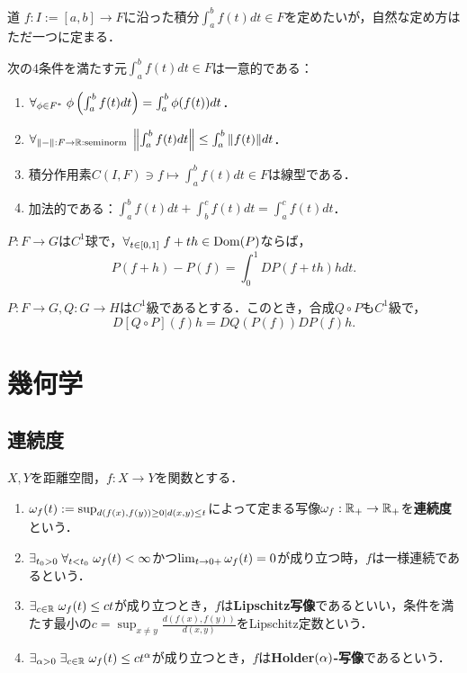 \documentclass[uplatex,dvipdfmx]{jsreport}
\begin{document}
\begin{notation}
    道
    $f:I:=[a,b]\to F$に沿った積分$\int^b_af(t)dt\in F$を定めたいが，自然な定め方はただ一つに定まる．
\end{notation}

\begin{theorem}
    次の4条件を満たす元$\int^b_af(t)dt\in F$は一意的である：
    \begin{enumerate}
        \item $\forall_{\phi\in F^*}\;\phi\left(\int^b_af(t)dt\right)=\int^b_a\phi(f(t))dt$．
        \item $\forall_{\|-\|:F\to\mathbb{R}:\text{seminorm}}\;\left\|\int^b_af(t)dt\right\|\le\int^b_a\|f(t)\|dt$．
        \item 積分作用素$C(I,F)\ni f\mapsto \int^b_af(t)dt\in F$は線型である．
        \item 加法的である：$\int^b_af(t)dt+\int^c_bf(t)dt=\int^c_af(t)dt$．
    \end{enumerate}
\end{theorem}

\begin{theorem}[微積分学の基本定理]
    $P:F\to G$は$C^1$球で，$\forall_{t\in[0,1]}\;f+th\in\mathrm{Dom}(P)$ならば，
    \[P(f+h)-P(f)=\int^1_0DP(f+th)hdt.\]
\end{theorem}

\begin{theorem}[連鎖律]
    $P:F\to G,Q:G\to H$は$C^1$級であるとする．このとき，合成$Q\circ P$も$C^1$級で，
    \[D[Q\circ P](f)h=DQ(P(f))DP(f)h.\]
\end{theorem}

\section{幾何学}

\subsection{連続度}

\begin{definition}
    $X,Y$を距離空間，$f:X\to Y$を関数とする．
    \begin{enumerate}
        \item $\omega_f(t):=\sup_{d(f(x),f(y))\ge0\mid d(x,y)\le t}$によって定まる写像$\omega_f:\mathbb{R}_+\to\mathbb{R}_+$を\textbf{連続度}という．
        \item $\exists_{t_0>0}\;\forall_{t<t_0}\;\omega_f(t)<\infty$かつ$\lim_{t\to0+}\omega_f(t)=0$が成り立つ時，$f$は一様連続であるという．
        \item $\exists_{c\in\mathbb{R}}\;\omega_f(t)\le ct$が成り立つとき，$f$は\textbf{Lipschitz写像}であるといい，条件を満たす最小の$c=\sup_{x\ne y}\frac{d(f(x),f(y))}{d(x,y)}$をLipschitz定数という．
        \item $\exists_{\alpha>0}\;\exists_{c\in\mathbb{R}}\;\omega_f(t)\le ct^\alpha$が成り立つとき，$f$は\textbf{Holder$(\alpha)$-写像}であるという．
    \end{enumerate}
\end{definition}
\end{document}
